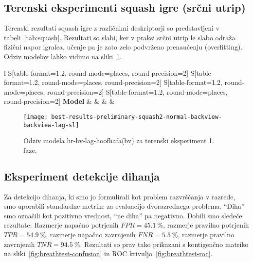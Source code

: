 \subsection{Terenski eksperimenti squash igre (srčni utrip)}
Terenski rezultati squash igre z različnimi deskriptorji so predstavljeni v tabeli~\ref{tab:squash}.  Rezultati so slabi, ker v praksi srčni utrip le slabo odraža fizični napor igralca, učenje pa je zato zelo podvrženo prenaučenju (overfitting). Odziv modelov lahko vidimo na sliki~\ref{fig:squash-rezultat}.

\begin{table}[!htbp]
	\centering
	\begin{tabular}{l S[table-format=1.2, round-mode=places, round-precision=2] S[table-format=1.2, round-mode=places, round-precision=2] S[table-format=1.2, round-mode=places, round-precision=2] S[table-format=1.2, round-mode=places, round-precision=2]}
		\toprule
		\textbf{Model} & \thead{\corr} & \thead{\rae} & \thead{\rrse} & \theadm{\nsv}\\
		\midrule
		\bottomrule
	\end{tabular}
	\caption[Validacijske metrike terenskega testiranja]{Validacijske metrike terenskega testiranja, kjer je bil kot referenčni parameter uporabljen srčni utrip. Tu uporabljamo deskriptorje HOOF in HOOF-HAFA. Modeli so neveljavni.}
	\label{tab:squash}
\end{table}

\begin{figure}[!htbp]
	\centering
	\texttt{[image: best-results-preliminary-squash2-normal-backview-backview-lag-sl]}
	\caption[Odziv modela hr-bv-lag-hoofhafa(bv) za terenski eksperiment 1. faze]{Odziv modela hr-bv-lag-hoofhafa(bv) za terenski eksperiment 1. faze.}
	\label{fig:squash-rezultat}
\end{figure}






















\subsection{Eksperiment detekcije dihanja}
Za detekcijo dihanja, ki smo jo formulirali kot problem razvrščanja v razrede, smo uporabili standardne metrike za evaluacijo dvorazrednega problema. ``Diha'' smo označili kot pozitivno vrednost, ``ne diha'' pa negativno. Dobili smo sledeče rezultate: Razmerje napačno potrjenih $FPR = \SI{45.1}{\%}$, razmerje pravilno potrjenih $TPR = \SI{54.9}{\%}$, razmerje napačno zavrnjenih $FNR = \SI{5.5}{\%}$, razmerje pravilno zavrnjenih $TNR = \SI{94.5}{\%}$. Rezultati so prav tako prikazani s kontigenčno matriko na sliki~\ref{fig:breathtest-confusion} in ROC krivuljo~\ref{fig:breathtest-roc}.

